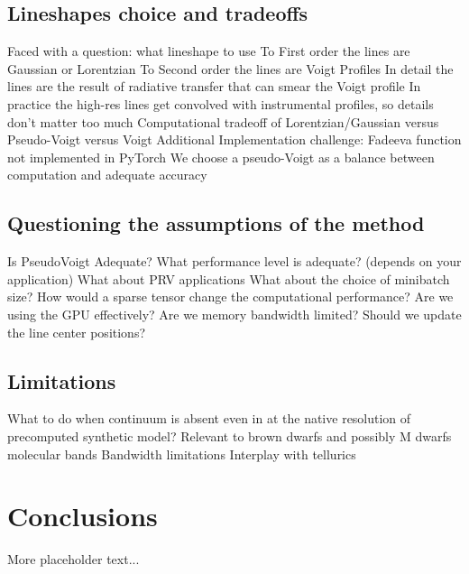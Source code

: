 \documentclass[modern]{aastex631}
\begin{document}
\subsection{Lineshapes choice and tradeoffs}
\begin{outline}
  \1 Faced with a question: what lineshape to use
  \2 To First order the lines are Gaussian or Lorentzian
  \2 To Second order the lines are Voigt Profiles
  \2 In detail the lines are the result of radiative transfer that can smear the Voigt profile
  \2 In practice the high-res lines get convolved with instrumental profiles, so details don't matter too much
  \1 Computational tradeoff of Lorentzian/Gaussian versus Pseudo-Voigt versus Voigt
  \2 Additional Implementation challenge: Fadeeva function not implemented in PyTorch
  \1 We choose a pseudo-Voigt as a balance between computation and adequate accuracy
\end{outline}

\subsection{Questioning the assumptions of the method}

\begin{outline}
  \1 Is PseudoVoigt Adequate?
  \1 What performance level is adequate? (depends on your application)
  \1 What about PRV applications
  \1 What about the choice of minibatch size?
  \1 How would a sparse tensor change the computational performance?
  \1 Are we using the GPU effectively?  Are we memory bandwidth limited?
  \1 Should we update the line center positions?
\end{outline}

\subsection{Limitations}
\begin{outline}
  \1 What to do when continuum is absent even in at the native resolution of precomputed synthetic model?
  \1 Relevant to brown dwarfs and possibly M dwarfs molecular bands
  \1 Bandwidth limitations
  \1 Interplay with tellurics
\end{outline}

\section{Conclusions}
More placeholder text...


\
\end{document}
